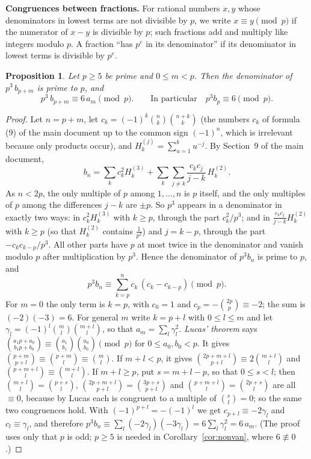 \documentclass[11pt]{article}
\newtheorem{proposition}[lemma]{Proposition}
\newcommand{\q}[1]{\medskip\noindent\textbf{#1}}
\begin{document}
\q{Congruences between fractions.} For rational numbers $x,y$ whose denominators in lowest terms
are not divisible by $p$, we write $x\equiv y\pmod p$ if the numerator of $x-y$ is divisible by
$p$; such fractions add and multiply like integers modulo $p$. A fraction ``has $p^e$ in its
denominator'' if its denominator in lowest terms is divisible by $p^e$.

\begin{proposition}\label{prop:cong}
Let $p\ge5$ be prime and $0\le m<p$. Then the denominator of $p^3\,b_{p+m}$ is prime to $p$, and
\[
p^3\,b_{p+m}\equiv6\,a_m\pmod p .\qquad\text{In particular}\quad p^3b_p\equiv6\pmod p .
\]
\end{proposition}
\begin{proof}
Let $n=p+m$, let $c_k=(-1)^k\binom nk\binom{n+k}k$ (the numbers $c_k$ of formula (9) of the main
document up to the common sign $(-1)^n$, which is irrelevant because only products occur), and
$H_k^{(j)}=\sum_{u=1}^ku^{-j}$. By Section~9 of the main document,
\[
b_n=\sum_{k}c_k^2H_k^{(3)}+\sum_k\sum_{j\ne k}\frac{c_kc_j}{j-k}\,H_k^{(2)} .
\]
As $n<2p$, the only multiple of $p$ among $1,\dots,n$ is $p$ itself, and the only multiples of $p$
among the differences $j-k$ are $\pm p$. So $p^3$ appears in a denominator in exactly two ways: in
$c_k^2H_k^{(3)}$ with $k\ge p$, through the part $c_k^2/p^3$; and in $\frac{c_kc_j}{j-k}H_k^{(2)}$
with $k\ge p$ (so that $H_k^{(2)}$ contains $\frac1{p^2}$) and $j=k-p$, through the part
$-c_kc_{k-p}/p^3$. All other parts have $p$ at most twice in the denominator and vanish modulo $p$
after multiplication by $p^3$. Hence the denominator of $p^3b_n$ is prime to $p$, and
\[
p^3b_n\equiv\sum_{k=p}^{n}c_k\,(c_k-c_{k-p})\pmod p .
\]
For $m=0$ the only term is $k=p$, with $c_0=1$ and $c_p=-\binom{2p}p\equiv-2$; the sum is
$(-2)(-3)=6$. For general $m$ write $k=p+l$ with $0\le l\le m$ and let
$\gamma_l=(-1)^l\binom ml\binom{m+l}l$, so that $a_m=\sum_l\gamma_l^2$. \emph{Lucas' theorem} says
$\binom{a_1p+a_0}{b_1p+b_0}\equiv\binom{a_1}{b_1}\binom{a_0}{b_0}\pmod p$ for $0\le a_0,b_0<p$. It
gives $\binom{p+m}{p+l}\equiv\binom{p+m}l\equiv\binom ml$. If $m+l<p$, it gives
$\binom{2p+m+l}{p+l}\equiv2\binom{m+l}l$ and $\binom{p+m+l}l\equiv\binom{m+l}l$. If $m+l\ge p$, put
$s=m+l-p$, so that $0\le s<l$; then $\binom{m+l}l=\binom{p+s}l$,
$\binom{2p+m+l}{p+l}=\binom{3p+s}{p+l}$ and $\binom{p+m+l}l=\binom{2p+s}l$ are all $\equiv0$, because
by Lucas each is congruent to a multiple of $\binom sl=0$; so the same two congruences hold. With
$(-1)^{p+l}=-(-1)^l$ we get $c_{p+l}\equiv-2\gamma_l$ and $c_l\equiv\gamma_l$, and therefore
$p^3b_n\equiv\sum_l(-2\gamma_l)(-3\gamma_l)=6\sum_l\gamma_l^2=6\,a_m$. (The proof uses only that $p$
is odd; $p\ge5$ is needed in Corollary~\ref{cor:nonvan}, where $6\not\equiv0$.)
\end{proof}
\end{document}

